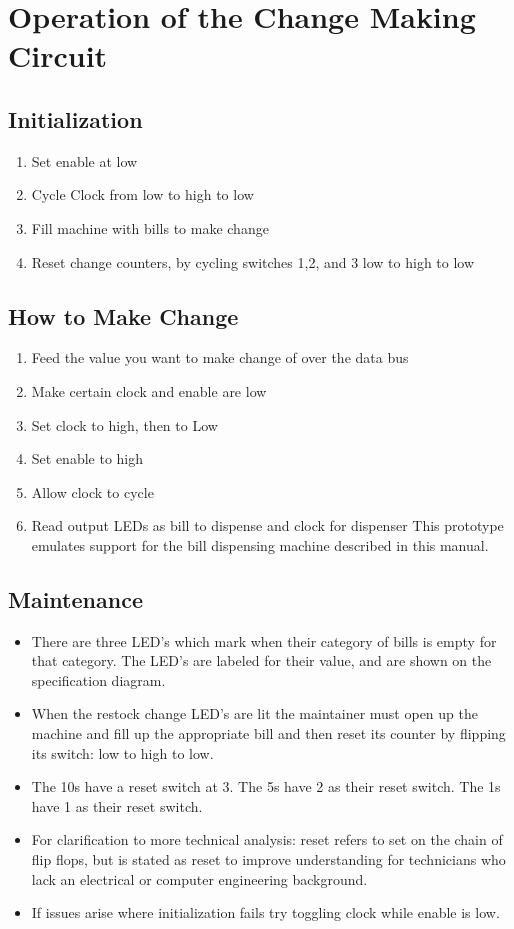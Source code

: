 \section{Operation of the Change Making Circuit}

\subsection{Initialization}
\begin{enumerate}
\item{Set enable at low}
\item{Cycle Clock from low to high to low}
\item{Fill machine with bills to make change}
\item{Reset change counters, by cycling switches 1,2, and 3 low to high to low}
\end{enumerate}

\subsection{How to Make Change}
\begin{enumerate}
\item{Feed the value you want to make change of over the data bus}
\item{Make certain clock and enable are low}
\item{Set clock to high, then to Low}
\item{Set enable to high}
\item{Allow clock to cycle}
\item{Read output LEDs as bill to dispense and clock for dispenser}
This prototype emulates support for the bill dispensing machine 
described in this manual.
\end{enumerate}

\subsection{Maintenance}
\begin{itemize}
\item{There are three LED's which mark when their category of  bills is empty
for that category. The LED's are labeled for their value, and are shown on the
specification diagram.}

\item{When the restock change LED's are lit the maintainer must open up the 
machine and fill up the appropriate bill and then reset its counter by 
flipping its switch: low to high to low.}

\item{The 10s have a reset switch at 3. The 5s have 2 as their reset switch.
The 1s have 1 as their reset switch.} 

\item{For clarification to more technical analysis: reset refers to set on
the chain of flip flops, but is stated as reset to improve understanding for 
technicians who lack an electrical or computer engineering background.}

\item{If issues arise where initialization fails try toggling clock while
enable is low.}
\end{itemize}
